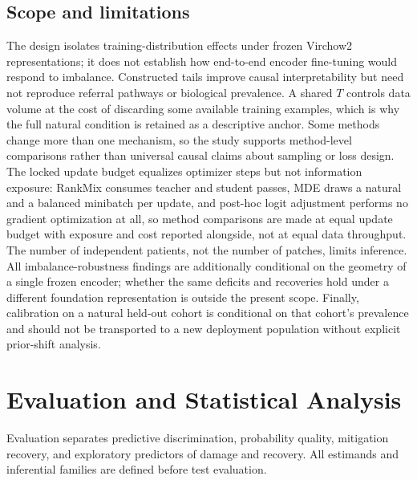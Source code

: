 \documentclass[11pt]{article}
\begin{document}
\subsection{Scope and limitations}
The design isolates training-distribution effects under frozen Virchow2 representations; it does not establish how end-to-end encoder fine-tuning would respond to imbalance. Constructed tails improve causal interpretability but need not reproduce referral pathways or biological prevalence. A shared $T$ controls data volume at the cost of discarding some available training examples, which is why the full natural condition is retained as a descriptive anchor. Some methods change more than one mechanism, so the study supports method-level comparisons rather than universal causal claims about sampling or loss design. The locked update budget equalizes optimizer steps but not information exposure: RankMix consumes teacher and student passes, MDE draws a natural and a balanced minibatch per update, and post-hoc logit adjustment performs no gradient optimization at all, so method comparisons are made at equal update budget with exposure and cost reported alongside, not at equal data throughput. The number of independent patients, not the number of patches, limits inference. All imbalance-robustness findings are additionally conditional on the geometry of a single frozen encoder; whether the same deficits and recoveries hold under a different foundation representation is outside the present scope. Finally, calibration on a natural held-out cohort is conditional on that cohort's prevalence and should not be transported to a new deployment population without explicit prior-shift analysis.

\section{Evaluation and Statistical Analysis}
\label{sec:analysis}
Evaluation separates predictive discrimination, probability quality, mitigation recovery, and exploratory predictors of damage and recovery. All estimands and inferential families are defined before test evaluation.
\end{document}
